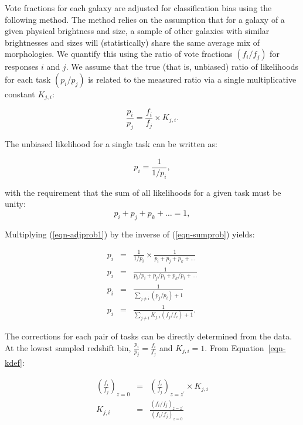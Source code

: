 \documentclass[useAMS,usenatbib]{mn2e}
\begin{document}
Vote fractions for each galaxy are adjusted for classification bias using the following method. The method relies on the assumption that for a galaxy of a given physical brightness and size, a sample of other galaxies with similar brightnesses and sizes will (statistically) share the same average mix of morphologies. We quantify this using the ratio of vote fractions $(f_i/f_j)$ for responses $i$ and $j$. We assume that the true (that is, unbiased) ratio of likelihoods for each task $(p_i/p_j)$ is related to the measured ratio via a single multiplicative constant $K_{j,i}$:

\begin{equation}
\frac{p_i}{p_j} = \frac{f_i}{f_j}\times K_{j,i}.
\label{eqn-kdef}
\end{equation}

\noindent The unbiased likelihood for a single task can be written as:

\begin{equation}
p_i = \frac{1}{1/p_i},
\label{eqn-adjprob1}
\end{equation}

\noindent with the requirement that the sum of all likelihoods for a given task must be unity:
\begin{equation}
p_i + p_j + p_k + \dots = 1,
\label{eqn-sumprob}
\end{equation}

\noindent Multiplying (\ref{eqn-adjprob1}) by the inverse of (\ref{eqn-sumprob}) yields:

\begin{eqnarray}
p_i &=& \frac{1}{1/p_i} \times \frac{1}{p_i + p_j + p_k + \dots} \\
p_i &=& \frac{1}{p_i/p_i + p_j/p_i + p_k/p_i + \dots} \\
p_i &=& \frac{1}{\sum\limits_{j\ne i}{(p_j/p_i)} + 1} \\
p_i &=& \frac{1}{\sum\limits_{j\ne i}{K_{j,i} (f_j/f_i)} + 1}.
\label{eqnarray-adjprob2}
\end{eqnarray}

The corrections for each pair of tasks can be directly determined from the data. At the lowest sampled redshift bin, $\frac{p_i}{p_j} = \frac{f_i}{f_j}$ and $K_{j,i}=1$. From Equation~\ref{eqn-kdef}:

\begin{eqnarray}
\left(\frac{f_i}{f_j}\right)_{z=0} &=& \left(\frac{f_i}{f_j}\right)_{z=z^\prime}\times K_{j,i} \\
K_{j,i} &=& \frac{\left(f_i/f_j\right)_{z=z^\prime} }{ \left(f_i/f_j\right)_{z=0}}
\label{eqnarray-adjprob3}
\end{eqnarray}
\end{document}
